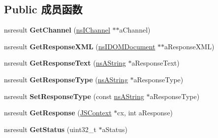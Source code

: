 \subsection*{Public 成员函数}
\begin{DoxyCompactItemize}
\item 
\mbox{\label{interfacens_i_x_m_l_http_request_a5750ddea27babcb2d4c6124168d2fda2}} 
nsresult {\bfseries Get\+Channel} (\hyperlink{interfacens_i_channel}{ns\+I\+Channel} $\ast$$\ast$a\+Channel)
\item 
\mbox{\label{interfacens_i_x_m_l_http_request_a4aac662201a219e3fa43564b462a2f60}} 
nsresult {\bfseries Get\+Response\+X\+ML} (\hyperlink{interfacens_i_d_o_m_document}{ns\+I\+D\+O\+M\+Document} $\ast$$\ast$a\+Response\+X\+ML)
\item 
\mbox{\label{interfacens_i_x_m_l_http_request_ac3a4e42cb83ef922a2ee048cfe41d33c}} 
nsresult {\bfseries Get\+Response\+Text} (\hyperlink{structns_string_container}{ns\+A\+String} $\ast$a\+Response\+Text)
\item 
\mbox{\label{interfacens_i_x_m_l_http_request_a6281fcd0f67db7eb699dc1b324d1d40b}} 
nsresult {\bfseries Get\+Response\+Type} (\hyperlink{structns_string_container}{ns\+A\+String} $\ast$a\+Response\+Type)
\item 
\mbox{\label{interfacens_i_x_m_l_http_request_a985e2e7cebee28a561476438784652b3}} 
nsresult {\bfseries Set\+Response\+Type} (const \hyperlink{structns_string_container}{ns\+A\+String} $\ast$a\+Response\+Type)
\item 
\mbox{\label{interfacens_i_x_m_l_http_request_a88e97816fae43304f5245318cfbe3ffa}} 
nsresult {\bfseries Get\+Response} (\hyperlink{interfacevoid}{J\+S\+Context} $\ast$cx, int a\+Response)
\item 
\mbox{\label{interfacens_i_x_m_l_http_request_a98a733b885cdfd88963cd3a8f8054c67}} 
nsresult {\bfseries Get\+Status} (uint32\+\_\+t $\ast$a\+Status)
\item 
\mbox{\label{interfacens_i_x_m_l_http_request_ac835e4f5a83e599ed7aed463939c74ae}} 

\end{DoxyCompactItemize}
